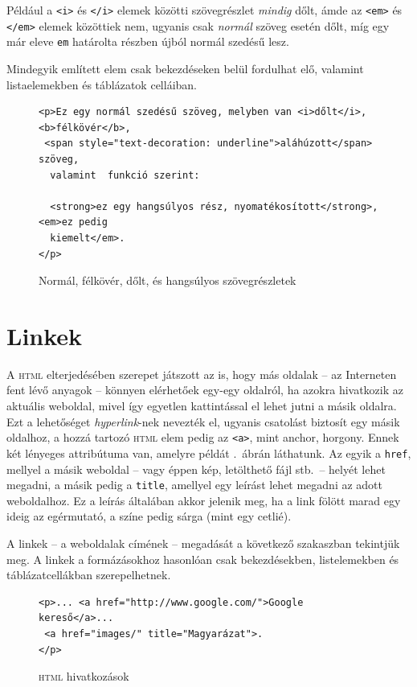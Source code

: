 Például a \verb|<i>| és \verb|</i>| elemek közötti szövegrészlet \emph{mindig}
dőlt, ámde az \verb|<em>| és \verb|</em>| elemek közöttiek nem, ugyanis csak
\emph{normál} szöveg esetén dőlt, míg egy már eleve \texttt{em} határolta
részben újból normál szedésű lesz.

Mindegyik említett elem csak bekezdéseken belül fordulhat elő, valamint
listaelemekben és táblázatok celláiban.

\begin{figure}[tbh]
\begin{Verbatim}[frame=single]
<p>Ez egy normál szedésű szöveg, melyben van <i>dőlt</i>, <b>félkövér</b>,
 <span style="text-decoration: underline">aláhúzott</span> szöveg,
  valamint  funkció szerint:
 
  <strong>ez egy hangsúlyos rész, nyomatékosított</strong>, <em>ez pedig
  kiemelt</em>.
</p>
\end{Verbatim}

  \caption{Normál, félkövér, dőlt, és hangsúlyos szövegrészletek}
  \label{fig:xhtml-formazas}
\end{figure}


\section{Linkek}

A \textsc{html} elterjedésében szerepet játszott az is, hogy más oldalak -- az
Interneten fent lévő anyagok -- könnyen elérhetőek egy-egy oldalról, ha azokra
hivatkozik az aktuális weboldal, mivel így egyetlen kattintással el lehet jutni
a másik oldalra. Ezt a lehetőséget \emph{hyperlink}-nek nevezték el, ugyanis
csatolást biztosít egy másik oldalhoz, a hozzá tartozó \textsc{html} elem pedig
az \verb|<a>|, mint anchor, horgony. Ennek két lényeges attribútuma van, amelyre
példát .\ ábrán láthatunk. Az egyik a \texttt{href},
mellyel a másik weboldal -- vagy éppen kép, letölthető fájl stb.\ -- helyét
lehet megadni, a másik pedig a \texttt{title}, amellyel egy leírást lehet
megadni az adott weboldalhoz. Ez a leírás általában akkor jelenik meg, ha a link
fölött marad egy ideig az egérmutató, a színe pedig sárga (mint egy cetlié).

A linkek -- a weboldalak címének -- megadását a következő szakaszban tekintjük
meg. A linkek a formázásokhoz hasonlóan csak bekezdésekben, listelemekben és
táblázatcellákban szerepelhetnek.

\begin{figure}[tbh]
\begin{Verbatim}[frame=single]
<p>... <a href="http://www.google.com/">Google kereső</a>...
 <a href="images/" title="Magyarázat">.
</p>
\end{Verbatim}
  \caption{\textsc{html} hivatkozások}
  \label{fig:html-anchors}
\end{figure}


